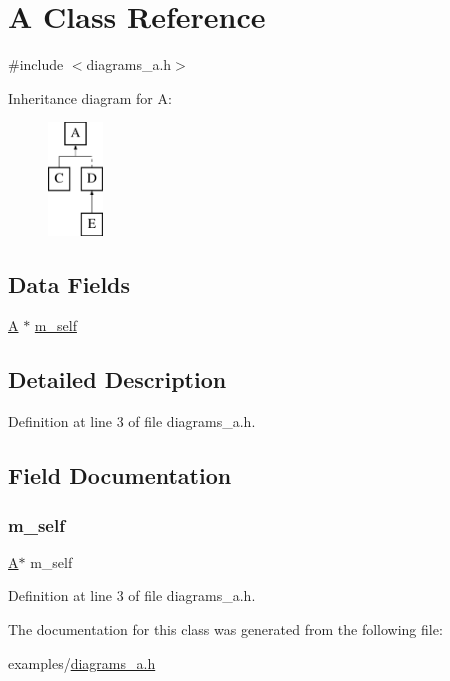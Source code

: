 \hypertarget{class_a}{}\section{A Class Reference}
\label{class_a}


{\ttfamily \#include $<$diagrams\+\_\+a.\+h$>$}

Inheritance diagram for A\+:\begin{figure}[H]
\begin{center}
\leavevmode
\includegraphics[height=3.000000cm]{class_a}
\end{center}
\end{figure}
\subsection*{Data Fields}
\begin{DoxyCompactItemize}
\item 
\hyperlink{class_a}{A} $\ast$ \hyperlink{class_a_afb4addbef001bc74a9b8dc36a11435d4}{m\+\_\+self}
\end{DoxyCompactItemize}


\subsection{Detailed Description}


Definition at line 3 of file diagrams\+\_\+a.\+h.



\subsection{Field Documentation}
\mbox{\label{class_a_afb4addbef001bc74a9b8dc36a11435d4}} 
\subsubsection{\texorpdfstring{m\+\_\+self}{m\_self}}
{\footnotesize\ttfamily \hyperlink{class_a}{A}$\ast$ m\+\_\+self}



Definition at line 3 of file diagrams\+\_\+a.\+h.



The documentation for this class was generated from the following file\+:\begin{DoxyCompactItemize}
\item 
examples/\hyperlink{diagrams__a_8h}{diagrams\+\_\+a.\+h}\end{DoxyCompactItemize}
